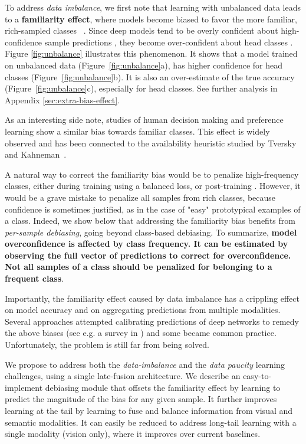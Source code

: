 \documentclass[10pt,twocolumn,letterpaper]{article}
\newcommand{\figref}[1]{Figure~\ref{#1}}
\begin{document}
To address \textit{data imbalance}, we first note that learning with unbalanced data leads to a \textbf{familiarity effect}, where models become biased to favor the more familiar, rich-sampled classes ~\cite{cpe,buda2017systematic}. Since deep models tend to be overly confident about high-confidence sample predictions \cite{Guo2017OnCO,Kull2019BeyondTS}, they become over-confident about head classes  
\cite{cpe,Wallace2013ImprovingCP,buda2017systematic}. Figure \ref{fig:unbalance} illustrates this phenomenon. It shows that a model trained on unbalanced data (\figref{fig:unbalance}a), has higher confidence for head classes (\figref{fig:unbalance}b). It is also an over-estimate of the true accuracy (\figref{fig:unbalance}c), especially for head classes. See further analysis in Appendix \ref{sec:extra-bias-effect}.


As an interesting side note, studies of human decision making and preference learning show a similar bias towards familiar classes. This effect is widely observed and has been connected to the availability heuristic studied by Tversky and Kahneman~\cite{Tversky1973AvailabilityAH}. 

A natural way to correct the familiarity bias would be to penalize high-frequency classes, either during training using a balanced loss, or post-training \cite{Kang2019DecouplingRA}. However, it would be a grave mistake to penalize all samples from rich classes, because confidence is sometimes justified, as in the case of "easy" prototypical examples of a class. Indeed, we show below that addressing the familiarity bias benefits from \textit{per-sample debiasing}, going beyond class-based debiasing.
To summarize, \textbf{model overconfidence is affected by class frequency. It can be estimated by observing the full vector of predictions to correct for overconfidence. Not all samples of a class should be penalized for belonging to a frequent class}.

Importantly, the familiarity effect caused by data imbalance has a crippling effect on model accuracy and on aggregating predictions from multiple modalities.
Several approaches attempted calibrating predictions of deep networks to remedy the above biases (see e.g. a survey in \cite{Guo2017OnCO}) and some became common practice. Unfortunately, the problem is still far from being solved.  

We propose to address both the \textit{data-imbalance} and the \textit{data paucity} learning challenges, using a single late-fusion architecture. 
We describe an easy-to-implement debiasing module that offsets the familiarity effect by learning to predict the magnitude of the bias for any given sample. It further improves learning at the tail by learning to fuse and balance information from visual and semantic modalities. It can easily be reduced to address long-tail learning with a single modality (vision only), where it improves over current baselines. 
\end{document}
